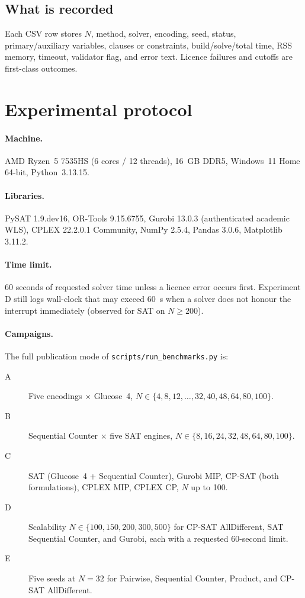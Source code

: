 \documentclass[a4paper,fleqn]{cas-sc}
\begin{document}
\subsection{What is recorded}
Each CSV row stores $N$, method, solver, encoding, seed, status, primary/auxiliary variables, clauses or constraints, build/solve/total time, RSS memory, timeout, validator flag, and error text.
Licence failures and cutoffs are first-class outcomes.

\section{Experimental protocol}
\label{sec:setup}

\paragraph{Machine.}
AMD Ryzen~5 7535HS (6 cores / 12 threads), 16~GB DDR5, Windows~11 Home 64-bit, Python~3.13.15.

\paragraph{Libraries.}
PySAT 1.9.dev16, OR-Tools 9.15.6755, Gurobi 13.0.3 (authenticated academic WLS), CPLEX 22.2.0.1 Community, NumPy 2.5.4, Pandas 3.0.6, Matplotlib 3.11.2.

\paragraph{Time limit.}
60 seconds of requested solver time unless a licence error occurs first.
Experiment D still logs wall-clock that may exceed 60~s when a solver does not honour the interrupt immediately (observed for SAT on $N\ge 200$).

\paragraph{Campaigns.}
The full publication mode of \texttt{scripts/run\_benchmarks.py} is:
\begin{description}
    \item[A] Five encodings $\times$ Glucose~4, $N\in\{4,8,12,\dots,32,40,48,64,80,100\}$.
    \item[B] Sequential Counter $\times$ five SAT engines, $N\in\{8,16,24,32,48,64,80,100\}$.
    \item[C] SAT (Glucose~4 + Sequential Counter), Gurobi MIP, CP-SAT (both formulations), CPLEX MIP, CPLEX CP, $N$ up to 100.
    \item[D] Scalability $N\in\{100,150,200,300,500\}$ for CP-SAT AllDifferent, SAT Sequential Counter, and Gurobi, each with a requested 60-second limit.
    \item[E] Five seeds at $N=32$ for Pairwise, Sequential Counter, Product, and CP-SAT AllDifferent.
\end{description}
\end{document}
